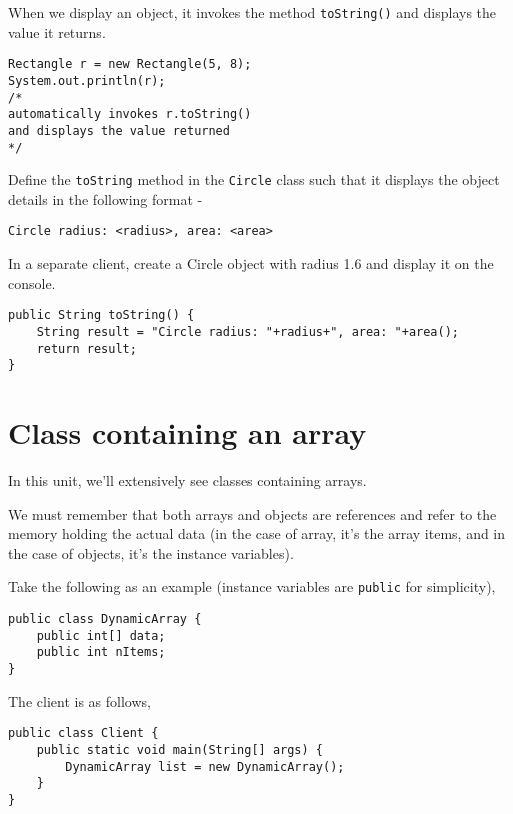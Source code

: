 \documentclass[abstracton]{scrartcl}
\begin{document}
When we display an object, it invokes the method \texttt{toString()} and displays the value it returns.

\begin{lstlisting}
Rectangle r = new Rectangle(5, 8);
System.out.println(r);
/*
automatically invokes r.toString() 
and displays the value returned
*/
\end{lstlisting}

\begin{exercise}
Define the \texttt{toString} method in the \texttt{Circle} class such that it displays the object details in the following format -

\begin{verbatim}
Circle radius: <radius>, area: <area>
\end{verbatim}

In a separate client, create a Circle object with radius 1.6 and display it on the console.
\end{exercise}
\begin{answer} \begin{lstlisting}
public String toString() {
	String result = "Circle radius: "+radius+", area: "+area();
	return result;
}	
\end{lstlisting} \end{answer}

\section{Class containing an array}

In this unit, we'll extensively see classes containing arrays. 

We must remember that both arrays and objects are references and refer to the memory holding the actual data (in the case of array, it's the array items, and in the case of objects, it's the instance variables).

Take the following as an example (instance variables are \texttt{public} for simplicity),

\begin{lstlisting}
public class DynamicArray {
	public int[] data;
	public int nItems;
}
\end{lstlisting}

The client is as follows,

\begin{lstlisting}
public class Client {
	public static void main(String[] args) {
		DynamicArray list = new DynamicArray();
	}
}
\end{lstlisting}
\end{document}
